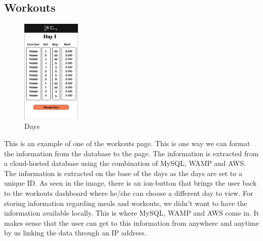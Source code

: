 \documentclass[a4paper,12pt]{report}
\begin{document}
\subsection{Workouts}
\begin{figure}
\centering
\includegraphics[width=0.25\textwidth]{images/dayWorkouts.png}
\caption{\label{fig:homepage}Days}
\end{figure}
This is an example of one of the workouts page. This is one way we can format the information from the database to the page. The information is extracted from a cloud-hosted database using the combination of MySQL, WAMP and AWS. The information is extracted on the base of the days as the days are set to a unique ID. As seen in the image, there is an ion-button that brings the user back to the workouts dashboard where he/she can choose a different day to view.
For storing information regarding meals and workouts, we didn't want to have the information available locally. This is where MySQL, WAMP and AWS come in. It makes sense that the user can get to this information from anywhere and anytime by us linking the data through an IP address.

\newpage
\end{document}
